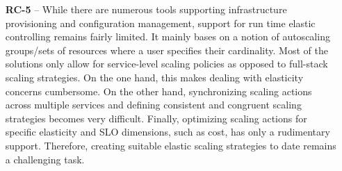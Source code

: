 \begin{itemize}
	\item [\textbf{RC-5}] -- 
	While there are numerous tools supporting infrastructure 
	provisioning and configuration management, support for run time elastic
	controlling remains fairly limited. It mainly bases on a notion 
	of autoscaling groups/sets of resources where a user specifies their cardinality.
	Most of the solutions only allow for service-level scaling policies 
	as opposed to full-stack scaling strategies. On the one hand, this 
	makes dealing with elasticity concerns cumbersome. On the other hand,
	synchronizing scaling actions across multiple services and 
	defining consistent and congruent scaling strategies becomes 
	very difficult. Finally, optimizing scaling actions 
	for specific elasticity and SLO dimensions, such as cost,	
	has only a rudimentary support.
	Therefore, creating suitable elastic scaling strategies to date remains
	a challenging task.
	
\end{itemize}